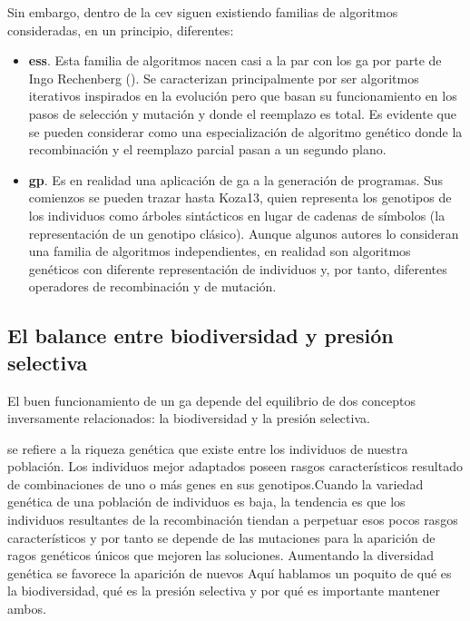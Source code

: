 Sin embargo, dentro de la \gls{cev} siguen existiendo familias de algoritmos consideradas, en un principio, diferentes:

\begin{itemize}
	\item \textbf{\glspl{es}}. Esta familia de algoritmos nacen casi a la par con los \gls{ga} por parte de Ingo Rechenberg (\cite{Rechenberg1973}). Se caracterizan principalmente por ser algoritmos iterativos inspirados en la evolución pero que basan su funcionamiento en los pasos de selección y mutación y donde el reemplazo es total. Es evidente que se pueden considerar como una especialización de algoritmo genético donde la recombinación y el reemplazo parcial pasan a un segundo plano.
	\item \textbf{\gls{gp}}. Es en realidad una aplicación de \gls{ga} a la generación de programas. Sus comienzos se pueden trazar hasta Koza13, quien representa los genotipos de los individuos como árboles sintácticos en lugar de cadenas de símbolos (la representación de un genotipo clásico). Aunque algunos autores lo consideran una familia de algoritmos independientes, en realidad son algoritmos genéticos con diferente representación de individuos y, por tanto, diferentes operadores de recombinación y de mutación.
\end{itemize}

\subsection{El balance entre biodiversidad y presión selectiva}

El buen funcionamiento de un \gls{ga} depende del equilibrio de dos conceptos inversamente relacionados: la biodiversidad y la presión selectiva.

 se refiere a la riqueza genética que existe entre los individuos de nuestra población. Los individuos mejor adaptados poseen rasgos característicos resultado de combinaciones de uno o más genes en sus genotipos\sidenote{}.Cuando la variedad genética de una población de individuos es baja, la tendencia es que los individuos resultantes de la recombinación tiendan a perpetuar esos pocos rasgos característicos y por tanto se depende de las mutaciones para la aparición de ragos genéticos únicos que mejoren las soluciones. Aumentando la diversidad genética se favorece la aparición de nuevos 
Aquí hablamos un poquito de qué es la biodiversidad, qué es la presión selectiva y por qué es importante mantener ambos.

